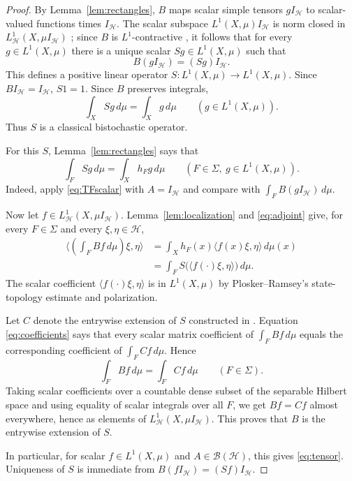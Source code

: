 \documentclass[11pt]{article}
\newcommand{\BH}{\mathcal B(\mathcal H)}
\newcommand{\HH}{\mathcal H}
\newcommand{\ip}[2]{\langle #1,#2\rangle}
\begin{document}
\begin{proof}
By Lemma~\ref{lem:rectangles}, \(B\) maps scalar simple tensors \(gI_{\HH}\)
to scalar-valued functions times \(I_{\HH}\).  The scalar subspace
\(L^1(X,\mu)I_{\HH}\) is norm closed in \(L^1_{\HH}(X,\mu I_{\HH})\)
\cite[Section 5, before Theorem 5.5]{PR}; since \(B\) is \(L^1\)-contractive
\cite[Proposition 5.4]{PR}, it follows that for every \(g\in L^1(X,\mu)\)
there is a unique scalar \(Sg\in L^1(X,\mu)\) such that
\[
        B(gI_{\HH})=(Sg)I_{\HH}.
\]
This defines a positive linear operator \(S:L^1(X,\mu)\to L^1(X,\mu)\).  Since
\(BI_{\HH}=I_{\HH}\), \(S1=1\).  Since \(B\) preserves integrals,
\[
        \int_X Sg\,d\mu=\int_X g\,d\mu\qquad(g\in L^1(X,\mu)).
\]
Thus \(S\) is a classical bistochastic operator.

For this \(S\), Lemma~\ref{lem:rectangles} says that
\[
        \int_F Sg\,d\mu=\int_X h_Fg\,d\mu
        \qquad(F\in\Sigma,\ g\in L^1(X,\mu)).
        \tag{8}\label{eq:adjoint}
\]
Indeed, apply \eqref{eq:TFscalar} with \(A=I_{\HH}\) and compare with
\(\int_F B(gI_{\HH})\,d\mu\).

Now let \(f\in L^1_{\HH}(X,\mu I_{\HH})\).  Lemma~\ref{lem:localization} and
\eqref{eq:adjoint} give, for every \(F\in\Sigma\) and every
\(\xi,\eta\in\HH\),
\[
\begin{aligned}
 \ip{\left(\int_F Bf\,d\mu\right)\xi}{\eta}
 &= \int_X h_F(x)\ip{f(x)\xi}{\eta}\,d\mu(x) \\
 &= \int_F S\big(\ip{f(\cdot)\xi}{\eta}\big)\,d\mu .
\end{aligned}
        \tag{9}\label{eq:coefficients}
\]
The scalar coefficient \(\ip{f(\cdot)\xi}{\eta}\) is in \(L^1(X,\mu)\) by
Plosker--Ramsey's state-topology estimate \cite[Lemma 3.3]{PR} and
polarization.

Let \(C\) denote the entrywise extension of \(S\) constructed in
\cite[Theorem 5.5]{PR}.  Equation \eqref{eq:coefficients} says that every
scalar matrix coefficient of \(\int_F Bf\,d\mu\) equals the corresponding
coefficient of \(\int_F Cf\,d\mu\).  Hence
\[
        \int_F Bf\,d\mu=\int_F Cf\,d\mu\qquad(F\in\Sigma).
\]
Taking scalar coefficients over a countable dense subset of the separable
Hilbert space and using equality of scalar integrals over all \(F\), we get
\(Bf=Cf\) almost everywhere, hence as elements of \(L^1_{\HH}(X,\mu I_{\HH})\).
This proves that \(B\) is the entrywise extension of \(S\).

In particular, for scalar \(f\in L^1(X,\mu)\) and \(A\in\BH\), this gives
\eqref{eq:tensor}.  Uniqueness of \(S\) is immediate from
\(B(fI_{\HH})=(Sf)I_{\HH}\).
\end{proof}
\end{document}
